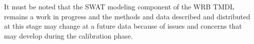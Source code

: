It must be noted that the SWAT modeling component of the WRB TMDL remains a work in progress and the methods and data described and distributed at this stage may change at a future data because of issues and concerns that may develop during the calibration phase.




%



\pagebreak




